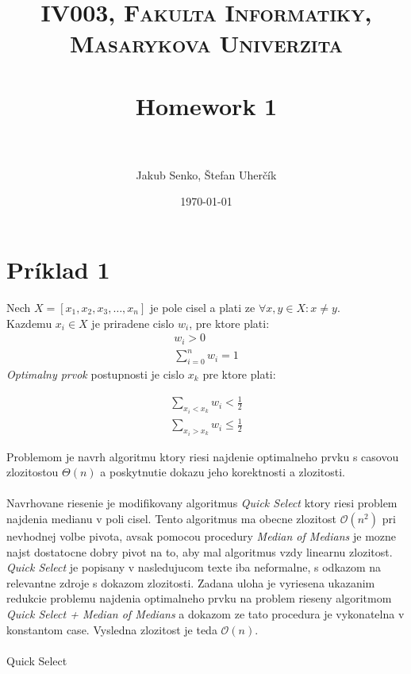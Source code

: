 \documentclass[paper=a4, fontsize=11pt]{scrartcl} %
\title{	
\normalfont \normalsize 
\textsc{IV003, Fakulta Informatiky, Masarykova Univerzita} \\ [25pt] %
\horrule{0.5pt} \\[0.4cm] %
\huge Homework 1 \\ %
\horrule{2pt} \\[0.5cm] %
}
\author{Jakub Senko, Štefan Uherčík} %
\date{\normalsize\today} %
\numberwithin{equation}{section} %
\numberwithin{figure}{section} %
\numberwithin{table}{section} %
\begin{document}
\maketitle %


\section*{Príklad 1}

Nech $X = [x_1, x_2, x_3, \dots, x_n]$ je pole cisel a plati ze $\forall x,y \in X: x \neq y$. \\
Kazdemu $x_i \in X$ je priradene cislo $w_i$, pre ktore plati:
\begin{equation}
    \begin{aligned}
        w_i > 0 \\
        \sum_{i = 0}^{n} w_i = 1
    \end{aligned}
\end{equation}
{\em Optimalny prvok} postupnosti je cislo $x_k$ pre ktore plati:

\begin{equation}
    \begin{aligned}
        \sum_{x_i < x_k} w_i < \frac{1}{2} \\
        \sum_{x_i > x_k} w_i \leq \frac{1}{2}
    \end{aligned}
\end{equation}

Problemom je navrh algoritmu ktory riesi najdenie optimalneho prvku s casovou zlozitostou $\Theta(n)$ a poskytnutie dokazu jeho korektnosti a zlozitosti. \\
\\
Navrhovane riesenie je modifikovany algoritmus {\em Quick Select} ktory riesi problem najdenia medianu v poli cisel. Tento algoritmus ma obecne zlozitost $\mathcal{O}(n^2)$ pri nevhodnej volbe pivota, avsak pomocou procedury {\em Median of Medians} je mozne najst dostatocne dobry pivot na to, aby mal algoritmus vzdy linearnu zlozitost.  {\em Quick Select} je popisany v nasledujucom texte iba neformalne, s odkazom na relevantne zdroje s dokazom zlozitosti. Zadana uloha  je vyriesena ukazanim redukcie problemu najdenia optimalneho prvku na problem rieseny algoritmom {\em Quick Select + Median of Medians} \cite{blum} a dokazom ze tato procedura je vykonatelna v konstantom case. Vysledna zlozitost je teda $\mathcal{O}(n)$. \\
\\
Quick Select \\
\end{document}
